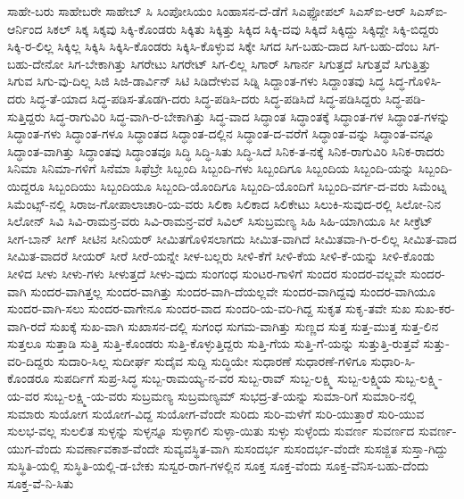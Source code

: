 {ಸಾಹೇ-ಬರು
ಸಾಹೇಬರೇ
ಸಾಹೇಬ್
ಸಿ
ಸಿಂಪೋಸಿಯಂ
ಸಿಂಹಾಸನ-ದೆ-ಡೆಗೆ
ಸಿಎಫ್ಪೋಪಲ್
ಸಿಎಸ್ಐ-ಆರ್
ಸಿಎಸ್ಐ-ಆರ್ನಿಂದ
ಸಿಕಲ್
ಸಿಕ್ಕ
ಸಿಕ್ಕವು
ಸಿಕ್ಕಿ-ಕೊಂಡರು
ಸಿಕ್ಕಿತು
ಸಿಕ್ಕಿತ್ತು
ಸಿಕ್ಕಿದ
ಸಿಕ್ಕಿ-ದವು
ಸಿಕ್ಕಿದೆ
ಸಿಕ್ಕಿದ್ದು
ಸಿಕ್ಕಿದ್ದೇ
ಸಿಕ್ಕಿ-ಬಿದ್ದರು
ಸಿಕ್ಕಿ-ರ-ಲಿಲ್ಲ
ಸಿಕ್ಕಿಲ್ಲ
ಸಿಕ್ಕಿಸಿ
ಸಿಕ್ಕಿಸಿ-ಕೊಂಡರು
ಸಿಕ್ಕಿಸಿ-ಕೊಳ್ಳುವ
ಸಿಕ್ಕೇ
ಸಿಗದ
ಸಿಗ-ಬಹು-ದಾದ
ಸಿಗ-ಬಹು-ದೆಂಬ
ಸಿಗ-ಬಹು-ದೇನೋ
ಸಿಗ-ಬೇಕಾಗಿತ್ತು
ಸಿಗರೇಟು
ಸಿಗರೇಟ್
ಸಿಗ-ಲಿಲ್ಲ
ಸಿಗಾರ್
ಸಿಗಾರ್ನ
ಸಿಗುತ್ತದೆ
ಸಿಗುತ್ತವೆ
ಸಿಗುತ್ತಿತ್ತು
ಸಿಗುವ
ಸಿಗು-ವು-ದಿಲ್ಲ
ಸಿಜಿ
ಸಿಜಿ-ಡಾರ್ವಿನ್
ಸಿಟಿ
ಸಿಡಿದೇಳುವ
ಸಿಡ್ನಿ
ಸಿದ್ದಾಂತ-ಗಳು
ಸಿದ್ದಾಂತವು
ಸಿದ್ಧ
ಸಿದ್ಧ-ಗೊಳಿಸಿ-ದರು
ಸಿದ್ಧ-ತೆ-ಯಾದ
ಸಿದ್ಧ-ಪಡಿಸ-ತೊಡಗಿ-ದರು
ಸಿದ್ಧ-ಪಡಿಸಿ-ದರು
ಸಿದ್ಧ-ಪಡಿಸಿದೆ
ಸಿದ್ಧ-ಪಡಿಸಿದ್ದರು
ಸಿದ್ಧ-ಪಡಿ-ಸುತ್ತಿದ್ದರು
ಸಿದ್ಧ-ರಾಗುವಿರಿ
ಸಿದ್ಧ-ವಾಗಿ-ರ-ಬೇಕಾಗಿತ್ತು
ಸಿದ್ಧ-ವಾದ
ಸಿದ್ಧಾಂತ
ಸಿದ್ಧಾಂತಕ್ಕೆ
ಸಿದ್ಧಾಂತ-ಗಳ
ಸಿದ್ಧಾಂತ-ಗಳನ್ನು
ಸಿದ್ಧಾಂತ-ಗಳು
ಸಿದ್ಧಾಂತ-ಗಳೂ
ಸಿದ್ಧಾಂತದ
ಸಿದ್ಧಾಂತ-ದಲ್ಲಿನ
ಸಿದ್ಧಾಂತ-ದ-ವರೆಗೆ
ಸಿದ್ಧಾಂತ-ವನ್ನು
ಸಿದ್ಧಾಂತ-ವನ್ನೂ
ಸಿದ್ಧಾಂತ-ವಾಗಿತ್ತು
ಸಿದ್ಧಾಂತವು
ಸಿದ್ಧಾಂತವೂ
ಸಿದ್ಧಿ
ಸಿದ್ಧಿ-ಸಿತು
ಸಿದ್ಧಿ-ಸಿದೆ
ಸಿನಿಕ-ತ-ನಕ್ಕೆ
ಸಿನಿಕ-ರಾಗುವಿರಿ
ಸಿನಿಕ-ರಾದರು
ಸಿನಿಮಾ
ಸಿನಿಮಾ-ಗಳಿಗೆ
ಸಿನೆಮಾ
ಸಿಫೆಬ್ರೇ
ಸಿಬ್ಬಂದಿ
ಸಿಬ್ಬಂದಿ-ಗಳು
ಸಿಬ್ಬಂದಿಗೂ
ಸಿಬ್ಬಂದಿಯ
ಸಿಬ್ಬಂದಿ-ಯನ್ನು
ಸಿಬ್ಬಂದಿ-ಯಿದ್ದರೂ
ಸಿಬ್ಬಂದಿಯು
ಸಿಬ್ಬಂದಿಯೂ
ಸಿಬ್ಬಂದಿ-ಯೊಂದಿಗೂ
ಸಿಬ್ಬಂದಿ-ಯೊಂದಿಗೆ
ಸಿಬ್ಬಂದಿ-ವರ್ಗ-ದ-ವರು
ಸಿಮೆಂಟ್ನ
ಸಿಮೆಂಟ್ಸ್-ನಲ್ಲಿ
ಸಿರಾಜ-ಗೋಪಾಲಾಚಾರಿ-ಯ-ವರು
ಸಿಲಿಕಾ
ಸಿಲಿಕಾದ
ಸಿಲಿಕೇಟು
ಸಿಲುಕಿ-ಸುವುದ-ರಲ್ಲಿ
ಸಿಲೋ-ನಿನ
ಸಿಲೋನ್
ಸಿವಿ
ಸಿವಿ-ರಾಮನ್ರ-ವರು
ಸಿವಿ-ರಾಮನ್ರ-ವರೆ
ಸಿವಿಲ್
ಸಿಸುಬ್ರಮಣ್ಯ
ಸಿಹಿ
ಸಿಹಿ-ಯಾಗಿಯೂ
ಸೀ
ಸೀಕ್ರೆಟ್
ಸೀಗ-ಬಾನ್
ಸೀಗ್
ಸೀಟಿನ
ಸೀನಿಯರ್
ಸೀಮಿತಗೊಳಿಸಲಾಗದು
ಸೀಮಿತ-ವಾಗಿದೆ
ಸೀಮಿತವಾ-ಗಿ-ರ-ಲಿಲ್ಲ
ಸೀಮಿತ-ವಾದ
ಸೀಮಿತ-ವಾದರೆ
ಸೀಯರ್
ಸೀರೆ
ಸೀರೆ-ಯನ್ನೇ
ಸೀಳ-ಬಲ್ಲರು
ಸೀಳಿ-ಕೆಗೆ
ಸೀಳಿ-ಕೆಯ
ಸೀಳಿ-ಕೆ-ಯನ್ನು
ಸೀಳಿ-ಕೊಂಡು
ಸೀಳಿದ
ಸೀಳು
ಸೀಳು-ಗಳು
ಸೀಳುತ್ತದೆ
ಸೀಳು-ವುದು
ಸುಂಗಂಧ
ಸುಂಟರ-ಗಾಳಿಗೆ
ಸುಂದರ
ಸುಂದರ-ವಲ್ಲವೇ
ಸುಂದರ-ವಾಗಿ
ಸುಂದರ-ವಾಗಿತ್ತಲ್ಲ
ಸುಂದರ-ವಾಗಿತ್ತು
ಸುಂದರ-ವಾಗಿ-ದೆಯಲ್ಲವೇ
ಸುಂದರ-ವಾಗಿದ್ದವು
ಸುಂದರ-ವಾಗಿಯೂ
ಸುಂದರ-ವಾಗಿ-ಸಲು
ಸುಂದರ-ವಾಗೇನೂ
ಸುಂದರ-ವಾದ
ಸುಂದರಿ-ಯ-ವರಿ-ಗಿದ್ದ
ಸುಕೃತ
ಸುಕೃ-ತವೇ
ಸುಖ
ಸುಖ-ಕರ-ವಾಗಿ-ರದೆ
ಸುಖಕ್ಕೆ
ಸುಖ-ವಾಗಿ
ಸುಖಾಸನ-ದಲ್ಲಿ
ಸುಗಂಧ
ಸುಗಮ-ವಾಗಿತ್ತು
ಸುಣ್ಣದ
ಸುತ್ತ
ಸುತ್ತ-ಮುತ್ತ
ಸುತ್ತ-ಲಿನ
ಸುತ್ತಲೂ
ಸುತ್ತಾಡಿ
ಸುತ್ತಿ
ಸುತ್ತಿ-ಕೊಂಡರು
ಸುತ್ತಿ-ಕೊಳ್ಳುತ್ತಿದ್ದರು
ಸುತ್ತಿ-ಗೆಯ
ಸುತ್ತಿ-ಗೆ-ಯನ್ನು
ಸುತ್ತುತ್ತಿ-ರುತ್ತವೆ
ಸುತ್ತು-ವರಿ-ದಿದ್ದರು
ಸುದಾರಿ-ಸಿಲ್ಲ
ಸುದೀರ್ಘ
ಸುದೈವ
ಸುದ್ದಿ
ಸುದ್ಧಿಯೇ
ಸುಧಾರಣೆ
ಸುಧಾರಣೆ-ಗಳಿಗೂ
ಸುಧಾರಿ-ಸಿ-ಕೊಂಡರೂ
ಸುಪರ್ದಿಗೆ
ಸುಪ್ರ-ಸಿದ್ಧ
ಸುಬ್ಬ-ರಾಮಯ್ಯ-ನ-ವರ
ಸುಬ್ಬ-ರಾವ್
ಸುಬ್ಬ-ಲಕ್ಷ್ಮಿ
ಸುಬ್ಬ-ಲಕ್ಷ್ಮಿಯ
ಸುಬ್ಬ-ಲಕ್ಷ್ಮಿ-ಯ-ವರ
ಸುಬ್ಬ-ಲಕ್ಷ್ಮಿ-ಯ-ವರು
ಸುಬ್ರಮಣ್ಯ
ಸುಬ್ರಮಣ್ಯಮ್
ಸುಭದ್ರ-ತೆ-ಯನ್ನು
ಸುಮಾ-ರಿಗೆ
ಸುಮಾರಿ-ನಲ್ಲಿ
ಸುಮಾರು
ಸುಯೋಗ
ಸುಯೋಗ-ವಿದ್ದ
ಸುಯೋಗ-ವೆಂದೇ
ಸುರಿದು
ಸುರಿ-ಮಳೆಗೆ
ಸುರಿ-ಯುತ್ತಾರೆ
ಸುರಿ-ಯುವ
ಸುಲಭ-ವಲ್ಲ
ಸುಲಲಿತ
ಸುಳ್ಳನ್ನು
ಸುಳ್ಳನ್ನೂ
ಸುಳ್ಳಾಗಲಿ
ಸುಳ್ಳಾ-ಯಿತು
ಸುಳ್ಳು
ಸುಳ್ಳೆಂದು
ಸುವರ್ಣ
ಸುವರ್ಣದ
ಸುವರ್ಣ-ಯುಗ-ವೆಂದು
ಸುವರ್ಣಾವಕಾಶ-ವೆಂದೇ
ಸುವ್ಯವಸ್ಥಿತ-ವಾಗಿ
ಸುಸಂದರ್ಭ
ಸುಸಂದರ್ಭ-ವೆಂದೇ
ಸುಸಜ್ಜಿತ
ಸುಸ್ತಾ-ಗಿದ್ದು
ಸುಸ್ಥಿತಿ-ಯಲ್ಲಿ
ಸುಸ್ಥಿತಿ-ಯಲ್ಲಿ-ಡ-ಬೇಕು
ಸುಸ್ವರ-ರಾಗ-ಗಳಲ್ಲಿನ
ಸೂಕ್ತ
ಸೂಕ್ತ-ವೆಂದು
ಸೂಕ್ತ-ವೆನಿಸ-ಬಹು-ದೆಂದು
ಸೂಕ್ತ-ವೆ-ನಿ-ಸಿತು
}
